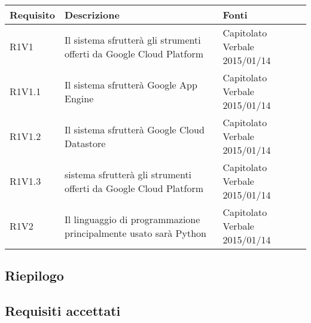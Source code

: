 \begin{center}

\bgroup
\def\arraystretch{1.5}
\begin{longtable}{| l | p{7cm} | p{2cm} |}

\hline
\textbf{Requisito} & \textbf{Descrizione} & \textbf{Fonti} \\
\hline

R1V1   &  Il sistema sfrutterà gli strumenti offerti da Google Cloud Platform  &  Capitolato \newline Verbale 2015/01/14 \\ 
\hline
R1V1.1   &  Il sistema sfrutterà Google App Engine  &  Capitolato \newline Verbale 2015/01/14 \\
\hline
R1V1.2   &  Il sistema sfrutterà Google Cloud Datastore}  &  Capitolato \newline Verbale 2015/01/14 \\
\hline
R1V1.3   &  sistema sfrutterà gli strumenti offerti da Google Cloud Platform  &  Capitolato \newline Verbale 2015/01/14 \\
\hline
R1V2   &  Il linguaggio di programmazione principalmente usato sarà Python  &  Capitolato \newline Verbale 2015/01/14 \\
\hline


\end{longtable}
\end{center}

\subsection{Riepilogo}

\subsection{Requisiti accettati}
